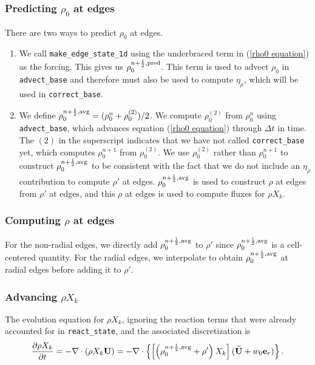 \subsubsection{Predicting $\rho_0$ at edges}\label{Predicting rho0 at edges}
There are two ways to predict $\rho_0$ at edges.
\begin{enumerate}
\item We call {\tt make\_edge\_state\_1d} using the underbraced term in 
(\ref{rho0 equation}) as the forcing.  This gives us $\rho_0^{n+\frac{1}{2},{\rm pred}}$.
This term is used to advect $\rho_0$ in {\tt advect\_base} and therefore must also be used 
to compute $\eta_\rho$, which will be used in {\tt correct\_base}.
\item We define $\rho_0^{n+\frac{1}{2},{\rm avg}} = (\rho_0^n + \rho_0^{(2)})/2$.  We 
compute $\rho_0^{(2)}$ from $\rho_0^n$ using {\tt advect\_base}, which advances equation 
(\ref{rho0 equation}) through $\Delta t$ in time.  The $(2)$ in the superscript indicates 
that we have not called {\tt correct\_base} yet, which computes  $\rho_0^{n+1}$ from $\rho_0^{(2)}$. 
We use $\rho_0^{(2)}$ rather than $\rho_0^{n+1}$ to construct $\rho_0^{n+\frac{1}{2},{\rm avg}}$ to be 
consistent with the fact that we do not include an $\eta_\rho$ contribution to compute 
$\rho'$ at edges.  $\rho_0^{n+\frac{1}{2},{\rm avg}}$ is used to construct $\rho$ at edges from 
$\rho'$ at edges, and this $\rho$ at edges is used to compute fluxes for $\rho X_k$.  
\end{enumerate}
\subsubsection{Computing $\rho$ at edges}\label{Computing rho at edges}
For the non-radial edges, we directly add $\rho_0^{n+\frac{1}{2},{\rm avg}}$ to $\rho'$ since 
$\rho_0^{n+\frac{1}{2},{\rm avg}}$ is a cell-centered quantity.  For the radial edges, we 
interpolate to obtain $\rho_0^{n+\frac{1}{2},{\rm avg}}$ at radial edges before adding it to $\rho'$.
\subsubsection{Advancing $\rho X_k$}\label{Advancing rhoX_k}
The evolution equation for $\rho X_k$, ignoring the reaction terms that were already 
accounted for in {\tt react\_state}, and the associated discretization is
\begin{equation}
\frac{\partial\rho X_k}{\partial t} = -\nabla\cdot(\rho X_k{\bf U}) = 
-\nabla\cdot\left\{\left[\left(\rho_0^{n+\frac{1}{2},{\rm avg}} 
+ \rho'\right)X_k\right](\widetilde{{\bf U}}+w_0{\bf e}_r)\right\}.
\end{equation}
